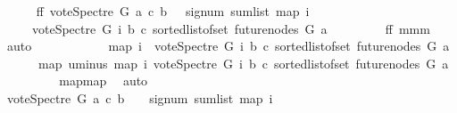 \begin{isabellebody}
\ \ \ \ \isamarkupfalse%
\ ff{}{\isacharcolon}{\kern0pt}\ {\isachardoublequoteopen}vote{\isacharunderscore}{\kern0pt}Spectre\ G\ a\ c\ b\ {\isacharequal}{\kern0pt}\ \ signum\ {\isacharparenleft}{\kern0pt}sum{\isacharunderscore}{\kern0pt}list\ {\isacharparenleft}{\kern0pt}map\ {\isacharparenleft}{\kern0pt}{\isasymlambda}i{\isachardot}{\kern0pt}\isanewline
\ \ \ \ {\isacharparenleft}{\kern0pt}{\isacharminus}{\kern0pt}\ vote{\isacharunderscore}{\kern0pt}Spectre\ G\ i\ b\ c{\isacharparenright}{\kern0pt}{\isacharparenright}{\kern0pt}\ {\isacharparenleft}{\kern0pt}sorted{\isacharunderscore}{\kern0pt}list{\isacharunderscore}{\kern0pt}of{\isacharunderscore}{\kern0pt}set\ {\isacharparenleft}{\kern0pt}future{\isacharunderscore}{\kern0pt}nodes\ G\ a{\isacharparenright}{\kern0pt}{\isacharparenright}{\kern0pt}{\isacharparenright}{\kern0pt}{\isacharparenright}{\kern0pt}{\isachardoublequoteclose}\ \isanewline
\ \ \ \ \ \ \isamarkupfalse%
\ ff{}\ mmm\ \isamarkupfalse%
\ auto\ \ \ \ \ \ \isanewline
\ \ \ \ \isamarkupfalse%
\ {\isachardoublequoteopen}{\isacharparenleft}{\kern0pt}map\ {\isacharparenleft}{\kern0pt}{\isasymlambda}i{\isachardot}{\kern0pt}\ {\isacharminus}{\kern0pt}\ vote{\isacharunderscore}{\kern0pt}Spectre\ G\ i\ b\ c{\isacharparenright}{\kern0pt}\ {\isacharparenleft}{\kern0pt}sorted{\isacharunderscore}{\kern0pt}list{\isacharunderscore}{\kern0pt}of{\isacharunderscore}{\kern0pt}set\ {\isacharparenleft}{\kern0pt}future{\isacharunderscore}{\kern0pt}nodes\ G\ a{\isacharparenright}{\kern0pt}{\isacharparenright}{\kern0pt}{\isacharparenright}{\kern0pt}\isanewline
\ \ \ \ \ {\isacharequal}{\kern0pt}\ {\isacharparenleft}{\kern0pt}map\ uminus\ {\isacharparenleft}{\kern0pt}map\ {\isacharparenleft}{\kern0pt}{\isasymlambda}i{\isachardot}{\kern0pt}\ vote{\isacharunderscore}{\kern0pt}Spectre\ G\ i\ b\ c{\isacharparenright}{\kern0pt}\ {\isacharparenleft}{\kern0pt}sorted{\isacharunderscore}{\kern0pt}list{\isacharunderscore}{\kern0pt}of{\isacharunderscore}{\kern0pt}set\ {\isacharparenleft}{\kern0pt}future{\isacharunderscore}{\kern0pt}nodes\ G\ a{\isacharparenright}{\kern0pt}{\isacharparenright}{\kern0pt}{\isacharparenright}{\kern0pt}{\isacharparenright}{\kern0pt}{\isachardoublequoteclose}\ \isanewline
\ \ \ \ \ \ \isamarkupfalse%
\ map{\isacharunderscore}{\kern0pt}map\ \isamarkupfalse%
\ auto\ \ \ \ \ \ \ \isanewline
\ \ \ \ \isamarkupfalse%
\ \isamarkupfalse%
\ {\isachardoublequoteopen}vote{\isacharunderscore}{\kern0pt}Spectre\ G\ a\ c\ b\ {\isacharequal}{\kern0pt}\ {\isacharminus}{\kern0pt}\ {\isacharparenleft}{\kern0pt}\ signum\ {\isacharparenleft}{\kern0pt}sum{\isacharunderscore}{\kern0pt}list\ {\isacharparenleft}{\kern0pt}map\ {\isacharparenleft}{\kern0pt}{\isasymlambda}i{\isachardot}{\kern0pt}\isanewline

\end{isabellebody}
